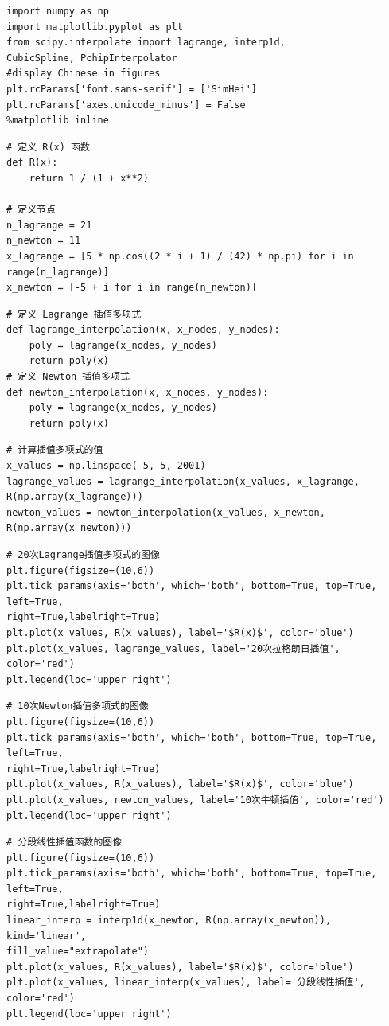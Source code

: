 \documentclass[UTF8,ctexart,a4paper,11pt,openany]{article}
\theoremstyle{definition}
\begin{document}
\begin{lstlisting}[aboveskip=0pt]
import numpy as np
import matplotlib.pyplot as plt
from scipy.interpolate import lagrange, interp1d, 
CubicSpline, PchipInterpolator
#display Chinese in figures
plt.rcParams['font.sans-serif'] = ['SimHei']
plt.rcParams['axes.unicode_minus'] = False
%matplotlib inline
\end{lstlisting}
\begin{lstlisting}[aboveskip=0pt]
# 定义 R(x) 函数
def R(x):
    return 1 / (1 + x**2)

# 定义节点
n_lagrange = 21
n_newton = 11
x_lagrange = [5 * np.cos((2 * i + 1) / (42) * np.pi) for i in range(n_lagrange)]
x_newton = [-5 + i for i in range(n_newton)]
\end{lstlisting}
\begin{lstlisting}[aboveskip=0pt]
# 定义 Lagrange 插值多项式
def lagrange_interpolation(x, x_nodes, y_nodes):
    poly = lagrange(x_nodes, y_nodes)
    return poly(x)
# 定义 Newton 插值多项式
def newton_interpolation(x, x_nodes, y_nodes):
    poly = lagrange(x_nodes, y_nodes)
    return poly(x)
\end{lstlisting}
\begin{lstlisting}[aboveskip=0pt]
# 计算插值多项式的值
x_values = np.linspace(-5, 5, 2001)
lagrange_values = lagrange_interpolation(x_values, x_lagrange, 
R(np.array(x_lagrange)))
newton_values = newton_interpolation(x_values, x_newton, R(np.array(x_newton)))
\end{lstlisting}
\begin{lstlisting}[aboveskip=0pt]
# 20次Lagrange插值多项式的图像
plt.figure(figsize=(10,6))
plt.tick_params(axis='both', which='both', bottom=True, top=True, left=True, 
right=True,labelright=True)
plt.plot(x_values, R(x_values), label='$R(x)$', color='blue')
plt.plot(x_values, lagrange_values, label='20次拉格朗日插值', color='red')
plt.legend(loc='upper right')
\end{lstlisting}
\begin{lstlisting}[aboveskip=0pt]
# 10次Newton插值多项式的图像
plt.figure(figsize=(10,6))
plt.tick_params(axis='both', which='both', bottom=True, top=True, left=True, 
right=True,labelright=True)
plt.plot(x_values, R(x_values), label='$R(x)$', color='blue')
plt.plot(x_values, newton_values, label='10次牛顿插值', color='red')
plt.legend(loc='upper right')
\end{lstlisting}
\begin{lstlisting}[aboveskip=0pt]
# 分段线性插值函数的图像
plt.figure(figsize=(10,6))
plt.tick_params(axis='both', which='both', bottom=True, top=True, left=True, 
right=True,labelright=True)
linear_interp = interp1d(x_newton, R(np.array(x_newton)), kind='linear', 
fill_value="extrapolate")
plt.plot(x_values, R(x_values), label='$R(x)$', color='blue')
plt.plot(x_values, linear_interp(x_values), label='分段线性插值', color='red')
plt.legend(loc='upper right')
\end{lstlisting}
\end{document}
